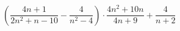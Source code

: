 \begin{ex}[type=expression]
	\begin{condition}
		\(\left( \dfrac{4n+1}{2n^2+n-10}-\dfrac{4}{n^2-4} \right)\cdot\dfrac{4n^2+10n}{4n+9}+\dfrac{4}{n+2}\)
	\end{condition}
\end{ex}